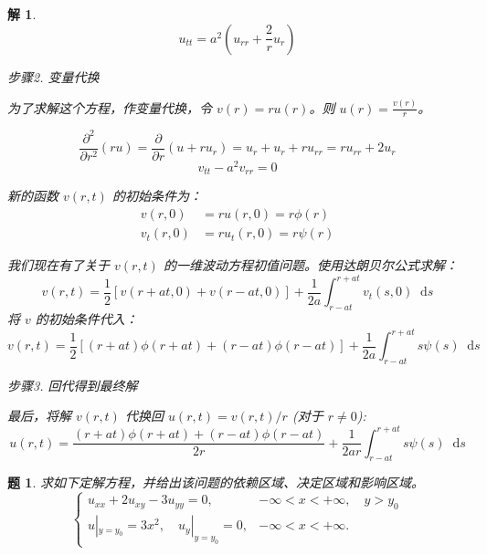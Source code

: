 \documentclass[12pt,a4paper]{article}
\newcommand{\diff}{\mathop{}\!\mathrm{d}}  %
\newtheorem{problem}{题}
\newtheorem*{solution}{解}
\begin{document}
\begin{solution}
\[
u_{tt} = a^2 \left(u_{rr} + \frac{2}{r} u_r \right)
\]

	步骤2. 变量代换

\noindent
为了求解这个方程，作变量代换，令 $v(r) = r u(r)$。则 $u(r) = \frac{v(r)}{r}$。

\begin{equation*}
	\frac{\partial^2}{\partial r^2}(ru) = \frac{\partial}{\partial r}(u + ru_r) = u_r + u_r + r u_{rr} = r u_{rr} + 2u_r
\end{equation*}
\[
v_{tt} - a^2 v_{rr} = 0
\]

新的函数 $v(r,t)$ 的初始条件为：
\begin{align*}
	v(r,0) &= r u(r,0) = r\phi(r) \\
	v_t(r,0) &= r u_t(r,0) = r\psi(r)
\end{align*}


我们现在有了关于 $v(r,t)$ 的一维波动方程初值问题。使用达朗贝尔公式求解：
\[
v(r,t) = \frac{1}{2} [v(r+at, 0) + v(r-at, 0)] + \frac{1}{2a} \int_{r-at}^{r+at} v_t(s,0) \diff s
\]
将 $v$ 的初始条件代入：
\[
v(r,t) = \frac{1}{2} [(r+at)\phi(r+at) + (r-at)\phi(r-at)] + \frac{1}{2a} \int_{r-at}^{r+at} s\psi(s) \diff s
\]


步骤3. 回代得到最终解

最后，将解 $v(r,t)$ 代换回 $u(r,t) = v(r,t)/r$ (对于 $r \neq 0$):
\[
u(r,t) = \frac{(r+at)\phi(r+at) + (r-at)\phi(r-at)}{2r} + \frac{1}{2ar} \int_{r-at}^{r+at} s\psi(s) \diff s
\]
	
\end{solution}
	
	\newpage
\begin{problem}

求如下定解方程，并给出该问题的依赖区域、决定区域和影响区域。
	\[
	\begin{cases}
		u_{xx} + 2u_{xy} - 3u_{yy} = 0, & -\infty < x < +\infty, \quad y > y_0 \\
		u|_{y=y_0} = 3x^2, \quad u_y|_{y=y_0} = 0, & -\infty < x < +\infty.
	\end{cases}
	\]
	
\end{problem}
\end{document}
